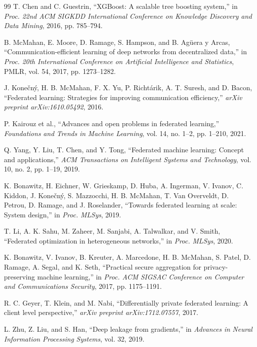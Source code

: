\begin{thebibliography}{99}
T. Chen and C. Guestrin, ``XGBoost: A scalable tree boosting system,'' in \textit{Proc. 22nd ACM SIGKDD International Conference on Knowledge Discovery and Data Mining}, 2016, pp. 785--794.

B. McMahan, E. Moore, D. Ramage, S. Hampson, and B. Ag\"uera y Arcas, ``Communication-efficient learning of deep networks from decentralized data,'' in \textit{Proc. 20th International Conference on Artificial Intelligence and Statistics}, PMLR, vol. 54, 2017, pp. 1273--1282.

J. Kone\v{c}n\'y, H. B. McMahan, F. X. Yu, P. Richt\'arik, A. T. Suresh, and D. Bacon, ``Federated learning: Strategies for improving communication efficiency,'' \textit{arXiv preprint arXiv:1610.05492}, 2016.

P. Kairouz et al., ``Advances and open problems in federated learning,'' \textit{Foundations and Trends in Machine Learning}, vol. 14, no. 1--2, pp. 1--210, 2021.

Q. Yang, Y. Liu, T. Chen, and Y. Tong, ``Federated machine learning: Concept and applications,'' \textit{ACM Transactions on Intelligent Systems and Technology}, vol. 10, no. 2, pp. 1--19, 2019.

K. Bonawitz, H. Eichner, W. Grieskamp, D. Huba, A. Ingerman, V. Ivanov, C. Kiddon, J. Kone\v{c}n\'y, S. Mazzocchi, H. B. McMahan, T. Van Overveldt, D. Petrou, D. Ramage, and J. Roselander, ``Towards federated learning at scale: System design,'' in \textit{Proc. MLSys}, 2019.

T. Li, A. K. Sahu, M. Zaheer, M. Sanjabi, A. Talwalkar, and V. Smith, ``Federated optimization in heterogeneous networks,'' in \textit{Proc. MLSys}, 2020.

K. Bonawitz, V. Ivanov, B. Kreuter, A. Marcedone, H. B. McMahan, S. Patel, D. Ramage, A. Segal, and K. Seth, ``Practical secure aggregation for privacy-preserving machine learning,'' in \textit{Proc. ACM SIGSAC Conference on Computer and Communications Security}, 2017, pp. 1175--1191.

R. C. Geyer, T. Klein, and M. Nabi, ``Differentially private federated learning: A client level perspective,'' \textit{arXiv preprint arXiv:1712.07557}, 2017.

L. Zhu, Z. Liu, and S. Han, ``Deep leakage from gradients,'' in \textit{Advances in Neural Information Processing Systems}, vol. 32, 2019.


\end{thebibliography}
